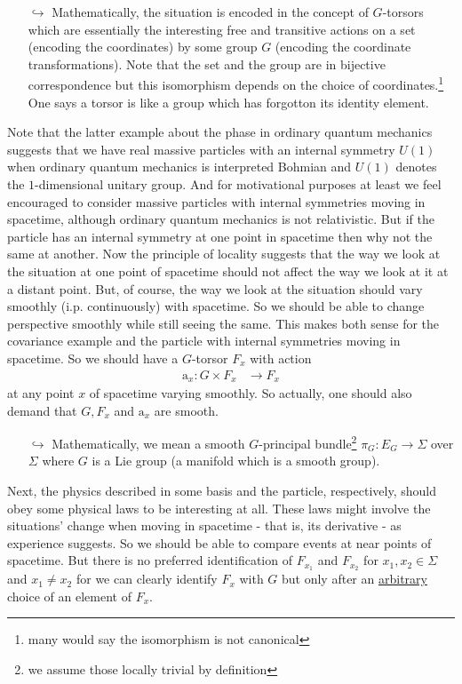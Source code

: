 \begin{enumerate}
\begin{enumerate}
\item[$\pmb{\hookrightarrow}$]
Mathematically, the situation is encoded in the concept of $G$-torsors which are essentially the {\glqq}interesting{\grqq} free and transitive actions on a set (encoding the coordinates) by some group $G$ (encoding the coordinate transformations). Note that the set and the group are in bijective correspondence but this isomorphism depends on the choice of coordinates.\footnote{many would say the isomorphism is not canonical} One says a torsor is like a group which has forgotton its identity element.
\end{enumerate}
Note that the latter example about the phase in ordinary quantum mechanics suggests that we have real massive particles with an internal symmetry $U(1)$ when ordinary quantum mechanics is interpreted Bohmian and $U(1)$ denotes the $1$-dimensional unitary group. And for motivational purposes at least we feel encouraged to consider massive particles with internal symmetries moving in spacetime, although ordinary quantum mechanics is not relativistic. But if the particle has an internal symmetry at one point in spacetime then why not the same at another. Now the principle of locality suggests that the way we look at the situation at one point of spacetime should not affect the way we look at it at a distant point. But, of course, the way we look at the situation should vary smoothly (i.p. continuously) with spacetime. So we should be able to change perspective smoothly while still seeing the same. This makes both sense for the covariance example and the particle with internal symmetries moving in spacetime. So we should have a $G$-torsor $F_{x}$ with action
\begin{align*}
  \mathrm{a}_{x}
  \colon
  G
  \times
  F_{x}
  &\rightarrow
  F_{x}
\end{align*}
 at any point $x$ of spacetime varying smoothly. So actually, one should also demand that $G,F_{x}$ and $\mathrm{a}_{x}$ are smooth.
\begin{enumerate}
\item[$\pmb{\hookrightarrow}$]
Mathematically, we mean a smooth $G$-principal bundle\footnote{we assume those locally trivial by definition} $\pi_{G} \colon E_{G} \rightarrow \Sigma$ over $\Sigma$ where $G$ is a Lie group (a manifold which is a {\glqq}smooth{\grqq} group).
\end{enumerate}
Next, the physics described in some basis and the particle, respectively, should obey some physical laws to be interesting at all. These laws might involve the situations' change when moving in spacetime - that is, its derivative - as experience suggests. So we should be able to compare events at near points of spacetime. But there is no preferred identification of $F_{x_{1}}$ and $F_{x_{2}}$ for $x_{1},x_{2} \in \Sigma$ and $x_{1} \neq x_{2}$ for we can clearly identify $F_{x}$ with $G$ but only after an \underline{arbitrary} choice of an element of $F_{x}$.

\end{enumerate}

